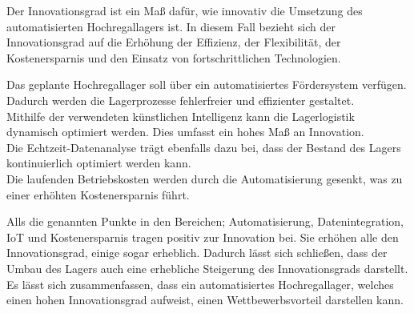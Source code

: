 Der Innovationsgrad ist ein Maß dafür, wie innovativ die Umsetzung des automatisierten Hochregallagers ist.  In diesem Fall bezieht sich der Innovationsgrad auf die Erhöhung der Effizienz, der Flexibilität, der Kostenersparnis und den Einsatz von fortschrittlichen Technologien.

Das geplante Hochregallager soll über ein automatisiertes Fördersystem verfügen. Dadurch werden die Lagerprozesse fehlerfreier und effizienter gestaltet. \\
Mithilfe der verwendeten künstlichen Intelligenz kann die Lagerlogistik dynamisch optimiert werden. Dies umfasst ein hohes Maß an Innovation. \\
Die Echtzeit-Datenanalyse trägt ebenfalls dazu bei, dass der Bestand des Lagers kontinuierlich optimiert werden kann. \\
Die laufenden Betriebskosten werden durch die Automatisierung gesenkt, was zu einer erhöhten Kostenersparnis führt.

Alls die genannten Punkte in den Bereichen; Automatisierung, Datenintegration, IoT und Kostenersparnis tragen positiv zur Innovation bei. Sie erhöhen alle den Innovationsgrad, einige sogar erheblich. Dadurch lässt sich schließen, dass der Umbau des Lagers auch eine erhebliche Steigerung des Innovationsgrads darstellt. Es lässt sich zusammenfassen, dass ein automatisiertes Hochregallager, welches einen hohen Innovationsgrad aufweist, einen Wettbewerbsvorteil darstellen kann.



